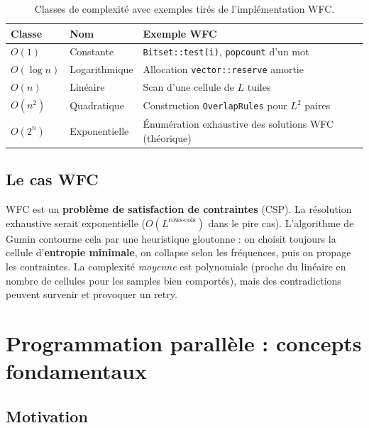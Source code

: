 \begin{table}[H]
\centering
\begin{tabular}{lll}
\toprule
\textbf{Classe} & \textbf{Nom} & \textbf{Exemple WFC} \\
\midrule
$O(1)$ & Constante & \texttt{Bitset::test(i)}, \texttt{popcount} d'un mot \\
$O(\log n)$ & Logarithmique & Allocation \texttt{vector::reserve} amortie \\
$O(n)$ & Linéaire & Scan d'une cellule de $L$ tuiles \\
$O(n^2)$ & Quadratique & Construction \texttt{OverlapRules} pour $L^2$ paires \\
$O(2^n)$ & Exponentielle & Énumération exhaustive des solutions WFC (théorique) \\
\bottomrule
\end{tabular}
\caption{Classes de complexité avec exemples tirés de l'implémentation WFC.}
\label{tab:complexity_classes}
\end{table}

\subsection{Le cas WFC}

WFC est un \textbf{problème de satisfaction de contraintes} (CSP). La résolution exhaustive serait exponentielle ($O(L^{\text{rows} \cdot \text{cols}})$ dans le pire cas). L'algorithme de Gumin contourne cela par une heuristique gloutonne : on choisit toujours la cellule d'\textbf{entropie minimale}, on collapse selon les fréquences, puis on propage les contraintes. La complexité \textit{moyenne} est polynomiale (proche du linéaire en nombre de cellules pour les samples bien comportés), mais des contradictions peuvent survenir et provoquer un retry.

\section{Programmation parallèle : concepts fondamentaux}
\label{sec:prelim:parallele}

\subsection{Motivation}

